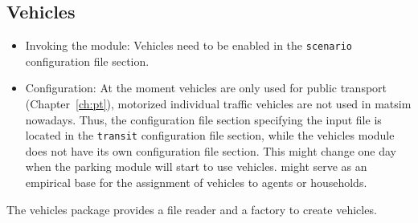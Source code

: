 

\subsection{Vehicles}
\label{sec:extending-vehicles}


\begin{itemize}\styleItemize
\item Invoking the module: Vehicles need to be enabled in the \lstinline|scenario| configuration file section.
\item Configuration: At the moment vehicles are only used for public transport (Chapter~\ref{ch:pt}), \ie motorized individual traffic vehicles are not used in \gls{matsim} nowadays. Thus, the configuration file section specifying the input file is located in the \lstinline|transit| configuration file section, while the vehicles module does not have its own configuration file section. 
%
This might change one day when the parking module will start to use vehicles. \citet[][]{JaeggiEtAl_TRR_2012} might serve as an empirical base for the assignment of vehicles to agents or households.
\end{itemize}

The vehicles package provides a file reader and a factory to create vehicles.


